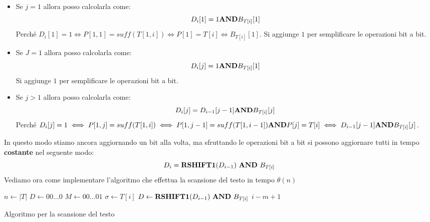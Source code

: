 \begin{itemize}
    \item Se $j =  1$ allora posso calcolarla come:
          \begin{equation}
              D_i[1] = 1 \text{\textbf{AND}} B_{T[i]}[1]
          \end{equation}
          Perché $D_i[1] = 1\iff P[1,1] =suff(T[1,i])\iff P[1] = T[i]\iff B_{T[i]}[1]$.
          Si aggiunge $1$ per semplificare le operazioni bit a bit.
    \item Se $J =  1$ allora posso calcolarla come:
          \begin{equation}
              D_i[j] = 1 \text{\textbf{AND}} B_{T[i]}[1]
          \end{equation}
          Si aggiunge $1$ per semplificare le operazioni bit a bit.
    \item Se $j > 1$ allora posso calcolarla come:
          \begin{equation}
              D_i[j] = D_{i - 1}[j - 1] \text{\textbf{AND}} B_{T[i]}[j]
          \end{equation}
          Perché $D_i[j] = 1 \iff P[1,j] = suff(T[1,i]) \iff P[1,j-1] = suff(T[1,i-1])
              \text{\textbf{AND}} P[j] = T[i] \iff D_{i-1}[j-1] \text{\textbf{AND}} B_{T[i]}[j]$.
\end{itemize}
In questo modo stiamo ancora aggiornando un bit alla volta, ma sfruttando le
operazioni bit a bit si possono aggiornare tutti in tempo \textbf{costante} nel seguente modo:
\begin{equation}
    D_i = \text{\textbf{RSHIFT1}}(D_{i - 1}) \ \text{\textbf{AND}} \ B_{T[i]}
\end{equation}
Vediamo ora come implementare l'algoritmo che effettua la scansione del testo in tempo $\theta(n)$
\begin{algorithm}
    \begin{algorithmic}
        \State $n \gets |T|$
        \State $D \gets 00\dots0$
        \State $M \gets 00\dots01$
        \State $\sigma \gets T[i]$
        \State $D \gets \text{\textbf{RSHIFT1}}(D_{i - 1}) \ \text{\textbf{AND}} \ B_{T[i]}$
        \State {} $i - m + 1$
        \EndIf
        \EndFor
        \EndFunction
    \end{algorithmic}
    \caption{Algoritmo per la scansione del testo}
\end{algorithm}
